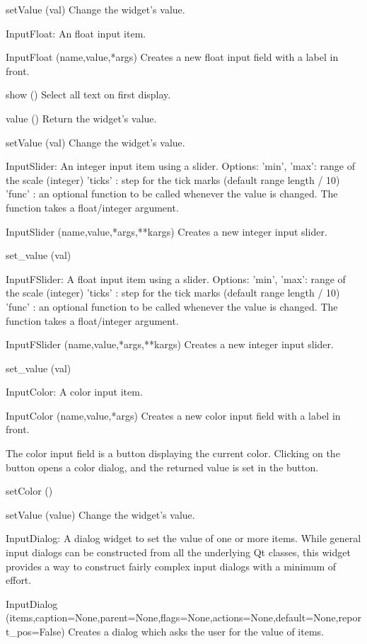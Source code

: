setValue (val)
Change the widget's value.

InputFloat: An float input item.

InputFloat (name,value,*args)
Creates a new float input field with a label in front.

show ()
Select all text on first display.

value ()
Return the widget's value.

setValue (val)
Change the widget's value.

InputSlider: An integer input item using a slider.
    Options:
      'min', 'max': range of the scale (integer)
      'ticks'     : step for the tick marks (default range length / 10)
      'func'      : an optional function to be called whenever the value is
                    changed. The function takes a float/integer argument.
    
InputSlider (name,value,*args,**kargs)
Creates a new integer input slider.

set_value (val)


InputFSlider: A float input item using a slider.
    Options:
      'min', 'max': range of the scale (integer)
      'ticks'     : step for the tick marks (default range length / 10)
      'func'      : an optional function to be called whenever the value is
                    changed. The function takes a float/integer argument.
    
InputFSlider (name,value,*args,**kargs)
Creates a new integer input slider.

set_value (val)


InputColor: A color input item.

InputColor (name,value,*args)
Creates a new color input field with a label in front.

        The color input field is a button displaying the current color.
        Clicking on the button opens a color dialog, and the returned
        value is set in the button.
        

setColor ()


setValue (value)
Change the widget's value.

InputDialog: A dialog widget to set the value of one or more items.
    While general input dialogs can be constructed from all the underlying
    Qt classes, this widget provides a way to construct fairly complex
    input dialogs with a minimum of effort.
    
InputDialog (items,caption=None,parent=None,flags=None,actions=None,default=None,report_pos=False)
Creates a dialog which asks the user for the value of items.

